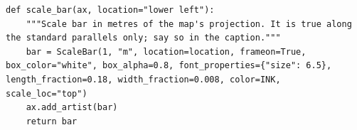 \begin{lstlisting}[firstnumber=74]
def scale_bar(ax, location="lower left"):
    """Scale bar in metres of the map's projection. It is true along the standard parallels only; say so in the caption."""
    bar = ScaleBar(1, "m", location=location, frameon=True, box_color="white", box_alpha=0.8, font_properties={"size": 6.5}, length_fraction=0.18, width_fraction=0.008, color=INK, scale_loc="top")
    ax.add_artist(bar)
    return bar
\end{lstlisting}

